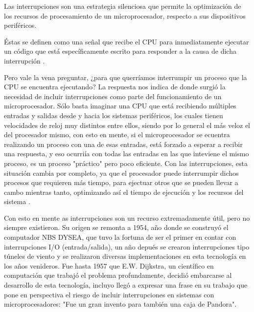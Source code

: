\documentclass[12pt,a4paper]{report}
\begin{document}
    \vspace{1cm}
       Las interrupciones son una estrategia silenciosa que permite la optimización de los recursos de procesamiento de un microprocesador, respecto a sus dispositivos periféricos.
   
   \vspace{1cm}
   
       Éstas se definen como una señal que recibe el CPU para inmediatamente ejecutar un código que está específicamente escrito para responder a la causa de dicha interrupción \cite{Mike Silva 2013}.
   
   \vspace{1cm}
   
       Pero vale la vena preguntar, ¿para que querríamos interrumpir un proceso que la CPU se encuentra ejecutando? La respuesta nos indica de donde surgió la necesidad de incluir interrupciones como parte del funcionamiento de un microprocesador. Sólo basta imaginar una CPU que está recibiendo múltiples entradas y salidas desde y hacia los sistemas periféricos, los cuales tienen velocidades de reloj muy distintos entre ellos, siendo por lo general el más veloz el del procesador mismo, con esto en mente, si el microprocesador se ecuentra realizando un proceso con una de esas entradas, está forzado a esperar a recibir una respuesta, y eso ocurriía con todas las entradas en las que inteviene el mismo proceso, es un proceso "práctico" pero poco eficiente. Con las interrupciones, esta situación cambia por completo, ya que el procesador puede interrumpir dichos procesos que requieren más tiempo, para ejectuar otros que se pueden llevar a cambo mientras tanto, optimizando así el tiempo de ejecución y los recursos del sistema \cite{Mike Silva 2013}.
       
       
   \vspace{1cm}
      Con esto en mente as interrupciones son un recurso extremadamente útil, pero no siempre existieron. Su origen se remonta a 1954, año donde se construyó el computador NBS DYSEA, que tuvo la fortuna de ser el primer en contar con interrupciones I/O (entrada/salida), un año depués se crearon interrupciones tipo túneles de viento y se realizaron diversas implementaciones en esta tecnología en los años venideros. Fue hasta 1957 que E.W. Dijkstra, un científico en computación que trabajó el problema profundamente, decidió embarcarse al desarrollo de esta tecnología, incluyo llegó a expresar una frase en su trabajo que pone en perspectiva el riesgo de incluir interrupciones en sistemas con microprocesadores: "Fue un gran invento para también una caja de Pandora".
      
\end{document}
